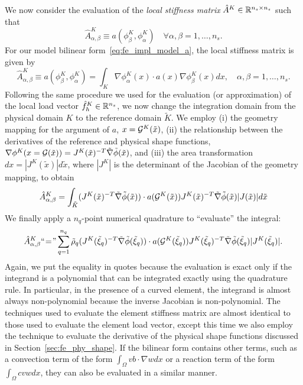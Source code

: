 We now consider the evaluation of the \emph{local stiffness matrix} $\hat A^K \in \mathbb{R}^{n_s \times n_s}$ such that
\begin{equation*}
  \hat A^K_{\alpha,\beta} \equiv a(\phi^K_\beta,\phi^K_\alpha) \quad \forall \alpha,\beta = 1,\dots,n_s.
\end{equation*}
For our model bilinear form~\eqref{eq:fe_impl_model_a}, the local stiffness matrix is given by
\begin{equation*}
  \hat A^K_{\alpha,\beta}
  \equiv
  a(\phi^K_\beta,\phi^K_\alpha) = \int_K \nabla \phi^K_\alpha(x) \cdot a(x) \nabla \phi^K_\beta(x) dx , \quad \alpha,\beta = 1,\dots,n_s.
\end{equation*}
Following the same procedure we used for the evaluation (or approximation) of the local load vector $\hat f_h^K \in \mathbb{R}^{n_s}$, we now change the integration domain from the physical domain $K$ to the reference domain $\tilde K$.  We employ (i) the geometry mapping for the argument of $a$, $x = \mathcal{G}^K(\tilde x)$, (ii) the relationship between the derivatives of the reference and physical shape functions, $\nabla \phi^K(x = \mathcal{G}(\tilde x)) = J^K(\tilde x)^{-T} \tilde \nabla \tilde \phi(\tilde x)$, and (iii) the area transformation $dx = |J^K(\tilde x)| d \tilde x$, where $|J^K|$ is the determinant of the Jacobian of the geometry mapping, to obtain
\begin{equation}
  \hat A^K_{\alpha,\beta}
  =
  \int_{\tilde K} (J^K(\tilde x)^{-T} \tilde \nabla \tilde \phi(\tilde x))
  \cdot a(\mathcal{G}^K(\tilde x)) J^K(\tilde x)^{-T} \tilde \nabla \tilde \phi(\tilde x)
  |J(\tilde x)| d\tilde x
  \label{eq:fe_impl_loc_mat_2}
\end{equation}
We finally apply a $n_q$-point numerical quadrature to ``evaluate'' the integral:
\begin{equation*}
  \hat A^K_{\alpha,\beta}
  \text{``}\hspace{-0.2em}=\hspace{-0.2em}\text{''}
  \sum_{q=1}^{n_q} \tilde \rho_q
   (J^K(\tilde \xi_q)^{-T} \tilde \nabla \tilde \phi(\tilde \xi_q))
  \cdot a(\mathcal{G}^K(\tilde \xi_q)) J^K(\tilde \xi_q)^{-T} \tilde \nabla \tilde \phi(\tilde \xi_q)
  |J^K(\tilde \xi_q)|.
\end{equation*}
Again, we put the equality in quotes because the evaluation is exact only if the integrand is a polynomial that can be integrated exactly using the quadrature rule.  In particular, in the presence of a curved element, the integrand is almost always non-polynomial because the inverse Jacobian is non-polynomial. The techniques used to evaluate the element stiffness matrix are almost identical to those used to evaluate the element load vector, except this time we also employ the technique to evaluate the derivative of the physical shape functions discussed in Section~\ref{sec:fe_phy_shape}. If the bilinear form contains other terms, such as a convection term of the form $\int_{\Omega} v b \cdot \nabla w dx$ or a reaction term of the form $\int_\Omega c v w dx$, they can also be evaluated in a similar manner.


